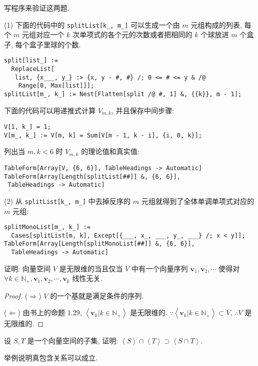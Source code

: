 \documentclass[color=black,device=normal,lang=cn,mode=geye]{elegantnote}
\begin{document}
\begin{note}
    写程序来验证这两题.

    (1) 下面的代码中的 \verb|splitList[k_, m_]| 可以生成一个由 $m$ 元组构成的列表, 每个 $m$ 元组对应一个 $k$ 次单项式的各个元的次数或者把相同的 $k$ 个球放进 $m$ 个盒子, 每个盒子里球的个数.
    \begin{lstlisting}
split[list_] := 
  ReplaceList[
   list, {x___, y_} :> {x, y - #, #} /; 0 <= # <= y & /@ 
    Range[0, Max[list]]];
splitList[m_, k_] := Nest[Flatten[split /@ #, 1] &, {{k}}, m - 1];
    \end{lstlisting}

    下面的代码可以用递推式计算 $V_{m,k}$, 并且保存中间步骤:
    \begin{lstlisting}
V[1, k_] = 1;
V[m_, k_] := V[m, k] = Sum[V[m - 1, k - i], {i, 0, k}];
    \end{lstlisting}

    列出当 $m,k<6$ 时 $V_{m,k}$ 的理论值和真实值:
    \begin{lstlisting}
TableForm[Array[V, {6, 6}], TableHeadings -> Automatic]
TableForm[Array[Length[splitList[##]] &, {6, 6}], 
 TableHeadings -> Automatic]
    \end{lstlisting}

    (2) 从 \verb|splitList[k_, m_]| 中去掉反序的 $m$ 元组就得到了全体单调单项式对应的 $m$ 元组:
    \begin{lstlisting}
splitMonoList[m_, k_] := 
  Cases[splitList[m, k], Except[{___, x_, ___, y_, ___} /; x < y]];
TableForm[Array[Length[splitMonoList[##]] &, {6, 6}], 
  TableHeadings -> Automatic]
    \end{lstlisting}
\end{note}
\begin{exercisec}[1.3.9]
    证明: 向量空间 $V$ 是无限维的当且仅当 $V$ 中有一个向量序列 $\boldsymbol{v}_1,\boldsymbol{v}_2,\cdots$ 使得对 $\forall k\in\mathbb{N}_+,\boldsymbol{v}_1,\boldsymbol{v}_2,\cdots,\boldsymbol{v}_k$ 线性无关.
\end{exercisec}
\begin{proof}
    ($\Rightarrow$) $V$ 的一个基就是满足条件的序列.

    ($\Leftarrow$) 由书上的命题 1.29, $\left<\boldsymbol{v}_k|k\in\mathbb{N}_+\right>$ 是无限维的. $\because\left<\boldsymbol{v}_k|k\in\mathbb{N}_+\right>\subset V$, $\therefore V$ 是无限维的.
\end{proof}
\begin{exercisec}[1.3.10, 有修改]
    设 $S,T$ 是一个向量空间的子集, 证明: $\left<S\right>\cap\left<T\right>\supset\left<S\cap T\right>$.

    举例说明真包含关系可以成立.
\end{exercisec}
\end{document}
